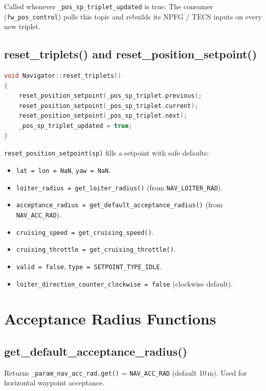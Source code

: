 \documentclass[12pt,a4paper]{article}
\begin{document}
Called whenever \texttt{\_pos\_sp\_triplet\_updated} is true.
The consumer (\texttt{fw\_pos\_control}) polls this topic and rebuilds its
NPFG / TECS inputs on every new triplet.

\subsection{reset\_triplets() and reset\_position\_setpoint()}

\begin{lstlisting}[language=C++]
void Navigator::reset_triplets()
{
    reset_position_setpoint(_pos_sp_triplet.previous);
    reset_position_setpoint(_pos_sp_triplet.current);
    reset_position_setpoint(_pos_sp_triplet.next);
    _pos_sp_triplet_updated = true;
}
\end{lstlisting}

\texttt{reset\_position\_setpoint(sp)} fills a setpoint with safe defaults:
\begin{itemize}
  \item \texttt{lat = lon = NaN}, \texttt{yaw = NaN}.
  \item \texttt{loiter\_radius = get\_loiter\_radius()} (from \texttt{NAV\_LOITER\_RAD}).
  \item \texttt{acceptance\_radius = get\_default\_acceptance\_radius()} (from \texttt{NAV\_ACC\_RAD}).
  \item \texttt{cruising\_speed = get\_cruising\_speed()}.
  \item \texttt{cruising\_throttle = get\_cruising\_throttle()}.
  \item \texttt{valid = false}, \texttt{type = SETPOINT\_TYPE\_IDLE}.
  \item \texttt{loiter\_direction\_counter\_clockwise = false} (clockwise default).
\end{itemize}

\section{Acceptance Radius Functions}

\subsection{get\_default\_acceptance\_radius()}
Returns \texttt{\_param\_nav\_acc\_rad.get()} = \texttt{NAV\_ACC\_RAD} (default 10\,m).
Used for horizontal waypoint acceptance.
\end{document}

